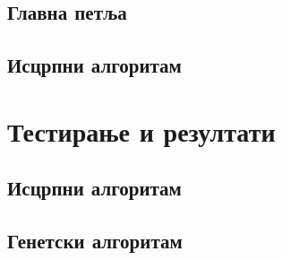 \documentclass[12pt,fleqn]{article}
\begin{document}
\subsection{Главна петља}
\blindtext

\subsection{Исцрпни алгоритам}
\blindtext

\section{Тестирање и резултати}
\subsection{Исцрпни алгоритам}
\blindtext

\subsection{Генетски алгоритам}
\blindtext

\printbibliography
\end{document}
